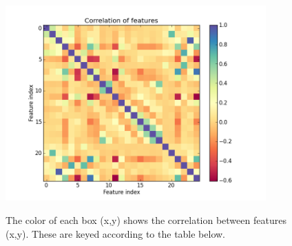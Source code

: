 \documentclass[ %
                    author={Sam Phippen},
                supervisor={Dr. Rafal Bogacz},
                     title={Real time voice activity detectors in noisy personal computing environments},
                  subtitle={},
                    degree={MEng},
                      year={2012} ]{thesis}
\begin{document}
\begin{figure}
    \begin{center}
        \includegraphics[width=10cm]{correlation_awesome.png}
    \end{center}

    The color of each box (x,y) shows the correlation between features (x,y).
    These are keyed according to the table below.


\end{figure}
\end{document}
